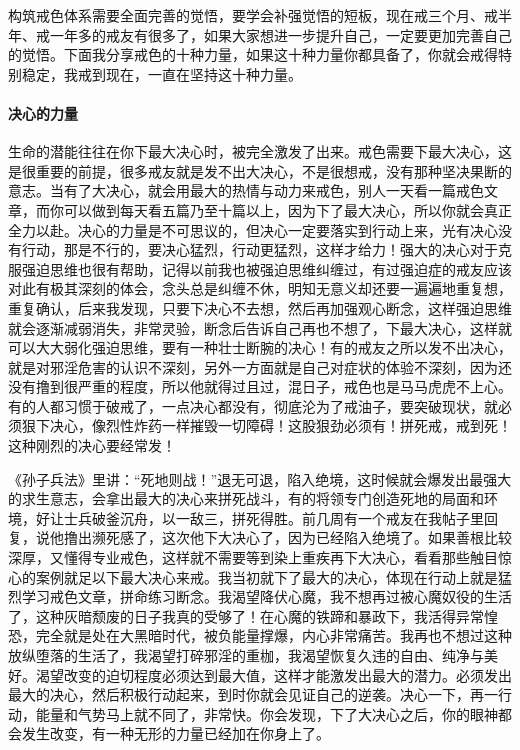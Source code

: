 构筑戒色体系需要全面完善的觉悟，要学会补强觉悟的短板，现在戒三个月、戒半年、戒一年多的戒友有很多了，如果大家想进一步提升自己，一定要更加完善自己的觉悟。下面我分享戒色的十种力量，如果这十种力量你都具备了，你就会戒得特别稳定，我戒到现在，一直在坚持这十种力量。

\paragraph{决心的力量}

生命的潜能往往在你下最大决心时，被完全激发了出来。戒色需要下最大决心，这是很重要的前提，很多戒友就是发不出大决心，不是很想戒，没有那种坚决果断的意志。当有了大决心，就会用最大的热情与动力来戒色，别人一天看一篇戒色文章，而你可以做到每天看五篇乃至十篇以上，因为下了最大决心，所以你就会真正全力以赴。决心的力量是不可思议的，但决心一定要落实到行动上来，光有决心没有行动，那是不行的，要决心猛烈，行动更猛烈，这样才给力！强大的决心对于克服强迫思维也很有帮助，记得以前我也被强迫思维纠缠过，有过强迫症的戒友应该对此有极其深刻的体会，念头总是纠缠不休，明知无意义却还要一遍遍地重复想，重复确认，后来我发现，只要下决心不去想，然后再加强观心断念，这样强迫思维就会逐渐减弱消失，非常灵验，断念后告诉自己再也不想了，下最大决心，这样就可以大大弱化强迫思维，要有一种壮士断腕的决心！有的戒友之所以发不出决心，就是对邪淫危害的认识不深刻，另外一方面就是自己对症状的体验不深刻，因为还没有撸到很严重的程度，所以他就得过且过，混日子，戒色也是马马虎虎不上心。有的人都习惯于破戒了，一点决心都没有，彻底沦为了戒油子，要突破现状，就必须狠下决心，像烈性炸药一样摧毁一切障碍！这股狠劲必须有！拼死戒，戒到死！这种刚烈的决心要经常发！

《孙子兵法》里讲：“死地则战！”退无可退，陷入绝境，这时候就会爆发出最强大的求生意志，会拿出最大的决心来拼死战斗，有的将领专门创造死地的局面和环境，好让士兵破釜沉舟，以一敌三，拼死得胜。前几周有一个戒友在我帖子里回复，说他撸出濒死感了，这次他下大决心了，因为已经陷入绝境了。如果善根比较深厚，又懂得专业戒色，这样就不需要等到染上重疾再下大决心，看看那些触目惊心的案例就足以下最大决心来戒。我当初就下了最大的决心，体现在行动上就是猛烈学习戒色文章，拼命练习断念。我渴望降伏心魔，我不想再过被心魔奴役的生活了，这种灰暗颓废的日子我真的受够了！在心魔的铁蹄和暴政下，我活得异常惶恐，完全就是处在大黑暗时代，被负能量撑爆，内心非常痛苦。我再也不想过这种放纵堕落的生活了，我渴望打碎邪淫的重枷，我渴望恢复久违的自由、纯净与美好。渴望改变的迫切程度必须达到最大值，这样才能激发出最大的潜力。必须发出最大的决心，然后积极行动起来，到时你就会见证自己的逆袭。决心一下，再一行动，能量和气势马上就不同了，非常快。你会发现，下了大决心之后，你的眼神都会发生改变，有一种无形的力量已经加在你身上了。

